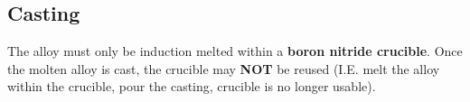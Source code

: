 \subsection{Casting}

The \MgZnCa alloy must only be induction melted within a \textbf{boron nitride crucible}. Once the molten alloy is cast, the crucible may \textbf{NOT} be reused (I.E. melt the alloy within the crucible, pour the casting, crucible is no longer usable). 